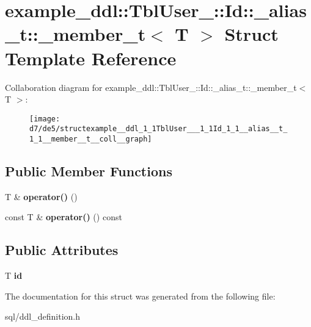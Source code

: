 \hypertarget{structexample__ddl_1_1TblUser___1_1Id_1_1__alias__t_1_1__member__t}{}\section{example\+\_\+ddl\+:\+:Tbl\+User\+\_\+\+:\+:Id\+:\+:\+\_\+alias\+\_\+t\+:\+:\+\_\+member\+\_\+t$<$ T $>$ Struct Template Reference}
\label{structexample__ddl_1_1TblUser___1_1Id_1_1__alias__t_1_1__member__t}


Collaboration diagram for example\+\_\+ddl\+:\+:Tbl\+User\+\_\+\+:\+:Id\+:\+:\+\_\+alias\+\_\+t\+:\+:\+\_\+member\+\_\+t$<$ T $>$\+:
\nopagebreak
\begin{figure}[H]
\begin{center}
\leavevmode
\texttt{[image: d7/de5/structexample\_\_ddl\_1\_1TblUser\_\_\_1\_1Id\_1\_1\_\_alias\_\_t\_1\_1\_\_member\_\_t\_\_coll\_\_graph]}
\end{center}
\end{figure}
\subsection*{Public Member Functions}
\begin{DoxyCompactItemize}
\item 
\hypertarget{structexample__ddl_1_1TblUser___1_1Id_1_1__alias__t_1_1__member__t_a7918e70c8f57dced4ebee5f8b2673ca0}{}T \& {\bfseries operator()} ()\label{structexample__ddl_1_1TblUser___1_1Id_1_1__alias__t_1_1__member__t_a7918e70c8f57dced4ebee5f8b2673ca0}

\item 
\hypertarget{structexample__ddl_1_1TblUser___1_1Id_1_1__alias__t_1_1__member__t_af970652001ac8b255ce110e25721baa9}{}const T \& {\bfseries operator()} () const \label{structexample__ddl_1_1TblUser___1_1Id_1_1__alias__t_1_1__member__t_af970652001ac8b255ce110e25721baa9}

\end{DoxyCompactItemize}
\subsection*{Public Attributes}
\begin{DoxyCompactItemize}
\item 
\hypertarget{structexample__ddl_1_1TblUser___1_1Id_1_1__alias__t_1_1__member__t_a6b49865f4d7af764d6548e99b87fe364}{}T {\bfseries id}\label{structexample__ddl_1_1TblUser___1_1Id_1_1__alias__t_1_1__member__t_a6b49865f4d7af764d6548e99b87fe364}

\end{DoxyCompactItemize}


The documentation for this struct was generated from the following file\+:\begin{DoxyCompactItemize}
\item 
sql/ddl\+\_\+definition.\+h\end{DoxyCompactItemize}
